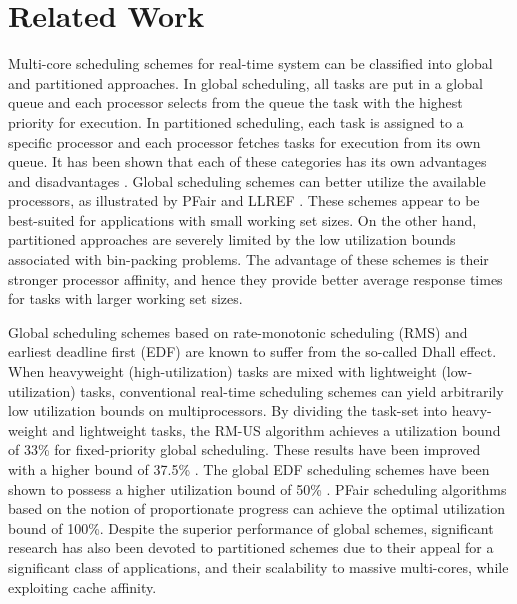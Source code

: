 \documentclass[12pt, journal,compsoc]{IEEEtran}
\begin{document}
\section{Related Work}
\label{rel}
Multi-core scheduling schemes for real-time system can be classified into global and partitioned approaches. In global scheduling, all tasks are put in a global queue and each processor selects from the queue the task with the highest priority for execution. In partitioned scheduling, each task is assigned to a specific processor and each processor fetches tasks for execution from its own queue. It has been shown that each of these categories has its own advantages and disadvantages \cite{Lauzac98comparisonof}. Global scheduling schemes can better utilize the available processors, as illustrated by PFair \cite{Baruah:1998:PSG:626526.627187} and LLREF \cite{Cho:2006:ORS:1193218.1194408}. These schemes appear to be best-suited for applications with small working set sizes. On the other hand, partitioned approaches are severely limited by the low utilization bounds associated with bin-packing problems. The advantage of these schemes is their stronger processor affinity, and hence they provide better average response times for tasks with larger working set sizes.

Global scheduling schemes based on rate-monotonic scheduling (RMS) and earliest deadline first (EDF) are known to suffer from the so-called Dhall effect. When heavyweight (high-utilization) tasks are mixed with lightweight (low-utilization) tasks, conventional real-time scheduling schemes can yield arbitrarily low utilization bounds on multiprocessors. By dividing the task-set into heavy-weight and lightweight tasks, the RM-US \cite{Andersson01static-priorityscheduling} algorithm achieves a utilization bound of 33\% for fixed-priority global scheduling. These results have been improved with a higher bound of 37.5\% \cite{Lundberg:2002:AFG:827265.828503}. The global EDF scheduling schemes have been shown to possess a higher utilization bound of 50\% \cite{Baker:2005:AES:1070609.1070737}. PFair scheduling algorithms based on the notion of proportionate progress \cite{Baruah:1993:PPN:167088.167194} can achieve the optimal utilization bound of 100\%. Despite the superior performance of global schemes, significant research has also been devoted to partitioned schemes due to their appeal for a significant class of applications, and their scalability to massive multi-cores, while exploiting cache affinity.
\end{document}
